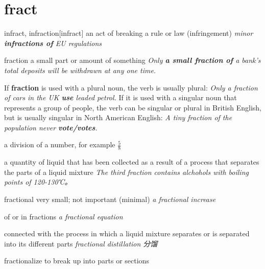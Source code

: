\section{fract}

\begin{DefWord}{infract, infraction}[infract]
    an act of breaking a rule or law (infringement)
    \textit{minor \textbf{infractions of} EU regulations}
\end{DefWord}

\begin{DefWord}{fraction}
    a small part or amount of something
    \textit{Only \textbf{a small fraction of} a bank's total deposits will be withdrawn at any one time.}

    \begin{remark}
        If \textbf{fraction} is used with a plural noun, the verb is usually plural: \textit{Only a fraction of cars in the UK \textbf{use} leaded petrol.} If it is used with a singular noun that represents a group of people, the verb can be singular or plural in British English, but is usually singular in North American English: \textit{A tiny fraction of the population never \textbf{vote/votes}.}
    \end{remark}

    a division of a number, for example $\frac{5}{8}$

    a quantity of liquid that has been collected as a result of a process that separates the parts of a liquid mixture
    \textit{The third fraction contains alchohols with boiling points of 120-130℃。}
\end{DefWord}



\begin{DefWord}{fractional}
    very small; not important (minimal)
    \textit{a fractional increase}

    of or in fractions
    \textit{a fractional equation}

    connected with the process in which a liquid mixture separates or is separated into its different parts
    \textit{fractional distillation 分馏}

\end{DefWord}

\begin{DefWord}{fractionalize}
    to break up into parts or sections
\end{DefWord}


